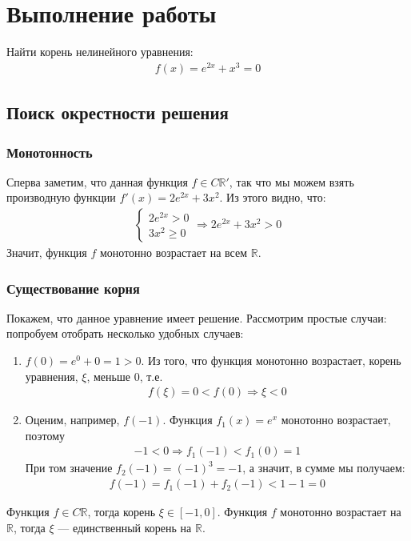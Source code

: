 \section{Выполнение работы}

Найти корень нелинейного уравнения:
\begin{align}
  f(x) = e^{2 x} + x^3 = 0
\end{align}

\subsection{Поиск окрестности решения}
\subsubsection{Монотонность}
 Сперва заметим, что данная функция \(f \in C \mathbb{R}'\), так что мы можем взять производную функции \(f'(x) = 2 e^{2 x} + 3 x^2 \). Из этого видно, что:
\begin{align}\label{eq:df_geq}
  \begin{cases}
    2 e^{2x} > 0 \\
    3 x^2 \geq 0
  \end{cases} 
  \Rightarrow
  2 e^{2 x} + 3 x^2 > 0
\end{align}
Значит, функция \(f\) монотонно возрастает на всем \(\mathbb{R}\). 
\subsubsection{Существование корня}
Покажем, что данное уравнение имеет решение. Рассмотрим простые случаи: попробуем отобрать несколько удобных случаев:
\begin{enumerate}
  \item \(f(0) = e^0 + 0 = 1 > 0 \). Из того, что функция монотонно возрастает, корень уравнения, \(\xi\), меньше \(0\), т.е. 
  \begin{align}
    f(\xi) = 0 < f(0) \Rightarrow \xi < 0
  \end{align}
\item Оценим, например, \(f(-1)\). Функция \(f_1(x) = e^x\) монотонно возрастает, поэтому
  \begin{align}
    -1 < 0 \Rightarrow f_1(-1) < f_1(0) = 1
  \end{align}
    При том значение \(f_2(-1)=(-1)^3=-1\), а значит, в сумме мы получаем:
  \begin{align}\label{eq:left_border}
    f(-1) = f_1(-1) + f_2(-1) < 1 - 1 = 0
  \end{align}
\end{enumerate}
Функция \(f \in C \mathbb{R}\), тогда корень \(\xi \in [-1, 0]\). Функция \(f\) монотонно возрастает на \(\mathbb{R}\), тогда \(\xi\) --- единственный корень на \(\mathbb{R}\).

